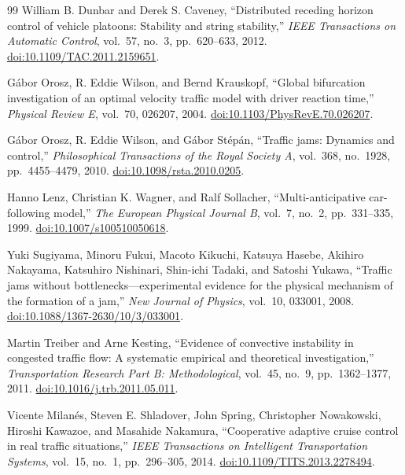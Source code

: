 \documentclass[11pt,a4paper,openany]{book}
\numberwithin{equation}{chapter}
\numberwithin{figure}{chapter}
\numberwithin{table}{chapter}
\begin{document}
\begin{thebibliography}{99}
William B. Dunbar and Derek S. Caveney,
``Distributed receding horizon control of vehicle platoons: Stability and string stability,''
\emph{IEEE Transactions on Automatic Control}, vol.~57, no.~3, pp.~620--633, 2012.
\href{https://doi.org/10.1109/TAC.2011.2159651}{doi:10.1109/TAC.2011.2159651}.

Gábor Orosz, R. Eddie Wilson, and Bernd Krauskopf,
``Global bifurcation investigation of an optimal velocity traffic model with driver reaction time,''
\emph{Physical Review E}, vol.~70, 026207, 2004.
\href{https://doi.org/10.1103/PhysRevE.70.026207}{doi:10.1103/PhysRevE.70.026207}.

Gábor Orosz, R. Eddie Wilson, and Gábor Stépán,
``Traffic jams: Dynamics and control,''
\emph{Philosophical Transactions of the Royal Society A}, vol.~368, no.~1928, pp.~4455--4479, 2010.
\href{https://doi.org/10.1098/rsta.2010.0205}{doi:10.1098/rsta.2010.0205}.

Hanno Lenz, Christian K. Wagner, and Ralf Sollacher,
``Multi-anticipative car-following model,''
\emph{The European Physical Journal B}, vol.~7, no.~2, pp.~331--335, 1999.
\href{https://doi.org/10.1007/s100510050618}{doi:10.1007/s100510050618}.

Yuki Sugiyama, Minoru Fukui, Macoto Kikuchi, Katsuya Hasebe, Akihiro Nakayama,
Katsuhiro Nishinari, Shin-ichi Tadaki, and Satoshi Yukawa,
``Traffic jams without bottlenecks---experimental evidence for the physical mechanism of the formation of a jam,''
\emph{New Journal of Physics}, vol.~10, 033001, 2008.
\href{https://doi.org/10.1088/1367-2630/10/3/033001}{doi:10.1088/1367-2630/10/3/033001}.

Martin Treiber and Arne Kesting,
``Evidence of convective instability in congested traffic flow: A systematic empirical and theoretical investigation,''
\emph{Transportation Research Part B: Methodological}, vol.~45, no.~9, pp.~1362--1377, 2011.
\href{https://doi.org/10.1016/j.trb.2011.05.011}{doi:10.1016/j.trb.2011.05.011}.

Vicente Milanés, Steven E. Shladover, John Spring, Christopher Nowakowski,
Hiroshi Kawazoe, and Masahide Nakamura,
``Cooperative adaptive cruise control in real traffic situations,''
\emph{IEEE Transactions on Intelligent Transportation Systems}, vol.~15, no.~1, pp.~296--305, 2014.
\href{https://doi.org/10.1109/TITS.2013.2278494}{doi:10.1109/TITS.2013.2278494}.


\end{thebibliography}
\end{document}
